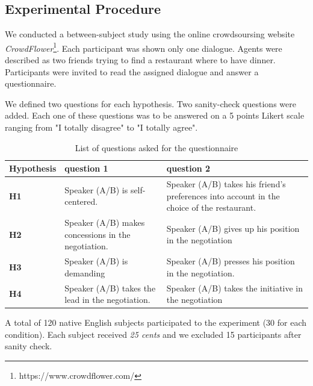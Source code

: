 \documentclass{llncs}
\begin{document}
			
			\subsection{Experimental Procedure}
			
			We conducted a between-subject study using the online crowdsoursing website \emph{CrowdFlower}\footnote{https://www.crowdflower.com/}. 
			Each participant was shown only one dialogue. Agents were described as two friends trying to find a restaurant where to have dinner. %
			Participants were invited to read the assigned dialogue and answer a questionnaire. 
			
			We defined two questions for each hypothesis. Two sanity-check questions were added. Each one of these questions was to be answered on a 5 points Likert scale ranging from "I totally disagree" to "I totally agree".
			
			\begin{table}
				{\scriptsize
					\begin{tabular}{|p{1.75cm}|p{5cm}|p{5.5cm}|}
						\hline
						Hypothesis &question 1& question 2 \\
						\hline
						\textbf{H1} &Speaker (A/B) is self-centered. &Speaker (A/B) takes his friend's preferences into account in the choice of the restaurant.\\
						\hline
						\textbf{H2} &Speaker (A/B) makes concessions in the negotiation.&Speaker (A/B) gives up his position in the negotiation\\
						\hline
						\textbf{H3} & Speaker (A/B) is demanding&Speaker (A/B) presses his position in the negotiation. \\
						\hline
						\textbf{H4} &Speaker (A/B) takes the lead in the negotiation.&Speaker (A/B) takes the initiative in the negotiation \\
						\hline
					\end{tabular}
				}
				\caption{List of questions asked for the questionnaire}
				\label{table:questionnaire}
			\end{table}
			\vspace{-1em} 
			A total of 120 native English subjects participated to the experiment (30 for each condition). Each subject received \textit{25 cents} and we excluded 15 participants after sanity check.
			
\end{document}
